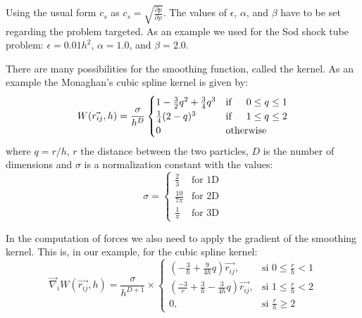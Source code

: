 Using the usual form $c_s$ as $c_s = \sqrt{\frac{\partial p}{\partial \rho}}$.
The values of $\epsilon$, $\alpha$, and $\beta$ have to be set regarding the problem targeted. 
As an example we used for the Sod shock tube problem: $\epsilon = 0.01h^2$, $\alpha = 1.0$, and $\beta = 2.0$. 


There are many possibilities for the smoothing function, called the kernel. 
As an example the Monaghan's cubic spline kernel is given by:
\begin{equation}
W(\vec{r_{ij}},h) = \frac{\sigma}{h^D} \begin{cases}
1-\frac{3}{2} q^2 + \frac{3}{4} q^3 & \text{if} \indent 0 \leq q \leq 1 \\
\frac{1}{4} (2-q)^3  & \text{if} \indent 1 \leq q \leq 2 \\
0 & \text{otherwise}
\end{cases}
\end{equation}
where $q = r/h$, $r$ the distance between the two particles, $D$ is the number of dimensions and $\sigma$ is a normalization constant with the values:
\begin{equation}
\sigma =  \begin{cases}
\frac{2}{3} & \text{for 1D}  \\
\frac{10}{7 \pi} & \text{for 2D} \\
\frac{1}{\pi} & \text{for 3D}
\end{cases}
\end{equation}

In the computation of forces we also need to apply the gradient of the smoothing kernel. 
This is, in our example, for the cubic spline kernel:
\begin{equation}
 \vec{\nabla}_iW(\vec{r_{ij}},h) = \frac{\sigma}{h^{D+1}} \times \begin{cases} ( -\frac{3}{h} + \frac{9}{4h}q) \vec{r_{ij}}, & \mbox{si } 0 \leq \frac{r}{h} < 1 \\ (\frac{-3}{r} + \frac{3}{h} - \frac{3}{4h}q ) \vec{r_{ij}}, & \mbox{si } 1 \leq \frac{r}{h} < 2\\ 0, & \mbox{si } \frac{r}{h} \geq 2 \end{cases}
\end{equation}

